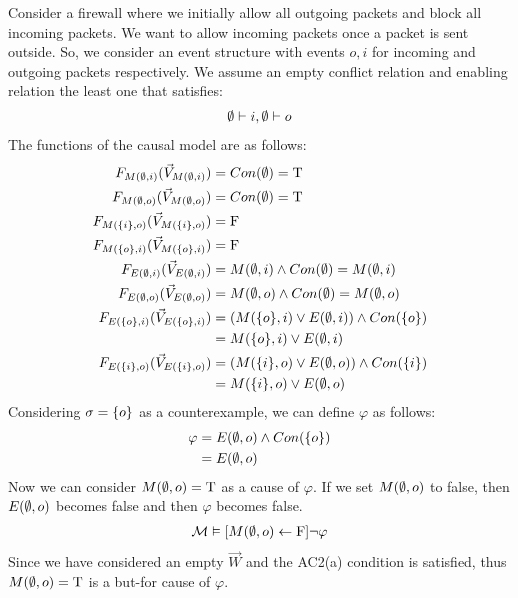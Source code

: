 \begin{example}
    Consider a firewall where we initially allow all outgoing packets and block all incoming packets.
    We want to allow incoming packets once a packet is sent outside.
    So, we consider an event structure with events $o,i$ for incoming and
    outgoing packets respectively.
    We assume an empty conflict relation and enabling relation
    the least one that satisfies:
    \begin{align*}
        \emptyset \vdash i, \emptyset \vdash o
    \end{align*}
    The functions of the causal model are as follows:
    \begin{align*}
        F_{M(\emptyset,i)}(\vec V_{M(\emptyset,i)})    & = Con(\emptyset) = \mathrm{T}                           \\
        F_{M(\emptyset,o)}(\vec V_{M(\emptyset,o)})    & = Con(\emptyset) = \mathrm{T}                           \\
        F_{M(\{i\},o)}(\vec V_{M(\{i\},o)}) & = \mathrm{F}                                     \\
        F_{M(\{o\},i)}(\vec V_{M(\{o\},i)}) & = \mathrm{F}                                     \\
        F_{E(\emptyset,i)}(\vec V_{E(\emptyset,i)})    & = M(\emptyset,i) \wedge Con(\emptyset) = M(\emptyset,i)       \\
        F_{E(\emptyset,o)}(\vec V_{E(\emptyset,o)})    & = M(\emptyset,o) \wedge Con(\emptyset) = M(\emptyset,o)       \\
        F_{E(\{o\},i)}(\vec V_{E(\{o\},i)}) & =
        \left( M(\{o\},i) \vee E(\emptyset,i)  \right) \wedge Con(\{o\}) \\
                       & = M(\{o\},i) \vee E(\emptyset,i)                \\
        F_{E(\{i\},o)}(\vec V_{E(\{i\},o)}) & =
        \left( M(\{i\},o) \vee E(\emptyset,o) \right)
        \wedge Con(\{i\})                                         \\
                       & = M(\{i\},o) \vee E(\emptyset,o)                \\
    \end{align*}
    Considering $\sigma = \{o\}$ as a counterexample, we can define $\varphi$ as follows:
    \begin{align*}
        \varphi & = E(\emptyset,o) \wedge Con(\{o\}) \\
                & = E(\emptyset,o)
    \end{align*}
    Now we can consider $M(\emptyset,o) = \mathrm{T}$ as a cause of $\varphi$.
    If we set $M(\emptyset,o)$ to false, then $E(\emptyset,o)$ becomes false
    and then $\varphi$ becomes false.
    \begin{align*}
        \mathcal{M} \vDash [M(\emptyset,o)\leftarrow \mathrm{F}] \neg \varphi
    \end{align*}
    Since we have considered an empty $\vec W$ and the AC2(a) condition
    is satisfied, thus $M(\emptyset,o) = \mathrm{T}$ is a but-for cause of $\varphi$.

\end{example}

